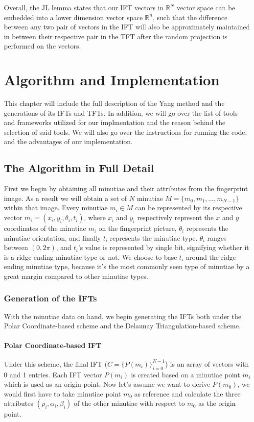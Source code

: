 \documentclass[fyp]{socreport}
\begin{document}
Overall, the JL lemma states that our IFT vectors in $\mathbb{R}^N$ vector space can be embedded into a lower dimension vector space $\mathbb{R}^n$, such that the difference between any two pair of vectors in the IFT will also be approximately maintained in between their respective pair in the TFT after the random projection is performed on the vectors.



\chapter{Algorithm and Implementation}
This chapter will include the full description of the Yang method and the generations of its IFTs and TFTs. In addition, we will go over the list of tools and frameworks utilized for our implmentation and the reason behind the selection of said tools. We will also go over the instructions for running the code, and the advantages of our implementation.

\section{The Algorithm in Full Detail}
First we begin by obtaining all minutiae and their attributes from the fingerprint image.  As a result we will obtain a set of $N$ minutiae $M = \{m_0, m_1, ..., m_{N-1}\}$ within that image. Every minutiae $m_i \in M$ can be represented by its respective vector $m_i = (x_i, y_i, \theta_i, t_i)$, where $x_i$ and $y_i$ respectively represent the $x$ and $y$ coordinates of the minutiae $m_i$ on the fingerprint picture, $\theta_i$ represents the minutiae orientation, and finally $t_i$ represents the minutiae type. $\theta_i$ ranges between $(0, 2\pi)$, and $t_i$'s value is represented by single bit, signifying whether it is a ridge ending minutiae type or not. We choose to base $t_i$ around the ridge ending minutiae type, because it's the most commonly seen type of minutiae by a great margin compared to other minutiae types. 

\subsection{Generation of the IFTs}
With the minutiae data on hand, we begin generating the IFTs both under the Polar Coordinate-based scheme and the Delaunay Triangulation-based scheme.

\subsubsection{Polar Coordinate-based IFT}
Under this scheme, the final IFT ($C = \{P(m_i)\}_{i=0}^{N-1}$) is an array of vectors with 0 and 1 entries. Each IFT vector $P(m_i)$ is created based on a minutiae point $m_i$ which is used as an origin point. Now let's assume we want to derive $P(m_0)$, we would first have to take minutiae point $m_0$ as reference and calculate the three attributes $(\rho_i, \alpha_i, \beta_i)$ of the other minutiae with respect to $m_0$ as the origin point. 
\end{document}

